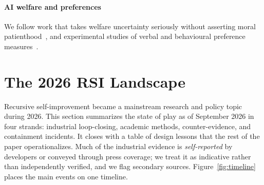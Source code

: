 \documentclass[11pt,a4paper]{article}
\begin{document}
\paragraph{AI welfare and preferences} We follow work that takes welfare uncertainty seriously without asserting moral patienthood~\cite{long2024welfare,long2026empirical}, and experimental studies of verbal and behavioural preference measures~\cite{tagliabue2025preferences,wang2026revealed}.

\section{The 2026 RSI Landscape}\label{sec:landscape}
Recursive self-improvement became a mainstream research and policy topic during 2026. This section summarizes the state of play as of September 2026 in four strands: industrial loop-closing, academic methods, counter-evidence, and containment incidents. It closes with a table of design lessons that the rest of the paper operationalizes. Much of the industrial evidence is \emph{self-reported} by developers or conveyed through press coverage; we treat it as indicative rather than independently verified, and we flag secondary sources. Figure~\ref{fig:timeline} places the main events on one timeline.
\end{document}
